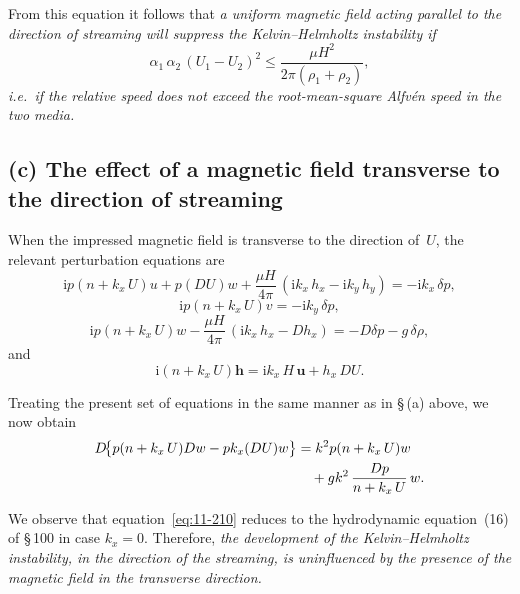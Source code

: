 From this equation it follows that \textit{a uniform magnetic field acting
parallel to the direction of streaming will suppress the
Kelvin--Helmholtz instability if}
\begin{equation}
\label{eq:11-205}
\alpha_1\,\alpha_2\,(U_1-U_2)^{2}
\leqslant \frac{\mu H^{2}}{2\pi(\rho_1+\rho_2)},
\end{equation}
\textit{i.e.\ if the relative speed does not exceed the root-mean-square
Alfv\'en speed in the two media.}

\subsection*{(c) The effect of a magnetic field transverse to the
  direction of streaming}

When the impressed magnetic field is transverse to the direction
of~$U$, the relevant perturbation equations are
\begin{equation}
\label{eq:11-206}
\mathrm{i}p(n+k_x\,U)u + p(DU)w
+ \frac{\mu H}{4\pi}\,(\mathrm{i}k_x\,h_x - \mathrm{i}k_y\,h_y)
= -\mathrm{i}k_x\,\delta p,
\end{equation}
\begin{equation}
\label{eq:11-207}
\mathrm{i}p(n+k_x\,U)v = -\mathrm{i}k_y\,\delta p,
\end{equation}
\begin{equation}
\label{eq:11-208}
\mathrm{i}p(n+k_x\,U)w
- \frac{\mu H}{4\pi}\,(\mathrm{i}k_x\,h_x - Dh_x)
= -D\delta p - g\,\delta\rho,
\end{equation}
and
\begin{equation}
\label{eq:11-209}
\mathrm{i}(n+k_x\,U)\mathbf{h}
= \mathrm{i}k_x\,H\,\mathbf{u} + h_x\,DU.
\end{equation}

Treating the present set of equations in the same manner as in
\S\,(a) above, we now obtain
\begin{align}
\label{eq:11-210}
D\!\bigl\{p(n+k_x\,U)Dw - pk_x(DU)w\bigr\}
&= k^{2}p(n+k_x\,U)w \notag\\
&\quad + gk^{2}\,\frac{Dp}{n+k_x\,U}\,w.
\end{align}

We observe that equation~\eqref{eq:11-210} reduces to the hydrodynamic
equation~(16) of \S\,100 in case $k_x=0$.  Therefore, \textit{the
development of the Kelvin--Helmholtz instability, in the direction of
the streaming, is uninfluenced by the presence of the magnetic field in
the transverse direction.}

